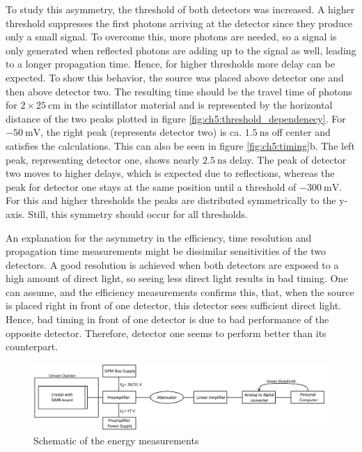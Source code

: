 To study this asymmetry, the threshold of both detectors was increased. A higher threshold suppresses the first photons arriving at the detector since they produce only a small signal. To overcome this, more photons are needed, so a signal is only generated when reflected photons are adding up to the signal as well, leading to a longer propagation time. Hence, for higher thresholds more delay can be expected. To show this behavior, the source was placed above detector one and then above detector two. The resulting time should be the travel time of photons for $2\times\SI{25}{\centi\meter}$ in the scintillator material and is represented by the horizontal distance of the two peaks plotted in figure \ref*{fig:ch5:threshold_dependenecy}. For $\SI{-50}{\milli\volt}$, the right peak (represents detector two) is ca. $\SI{1.5}{\nano\second}$ off center and satisfies the calculations. This can also be seen in figure \ref{fig:ch5:timing}b. The left peak, representing detector one, shows nearly $\SI{2.5}{\nano\second}$ delay. The peak of detector two moves to higher delays, which is expected due to reflections, whereas the peak for detector one stays at the same position until a threshold of $\SI{-300}{\milli\volt}$. For this and higher thresholds the peaks are distributed symmetrically to the y-axis. Still, this symmetry should occur for all thresholds. \par
An explanation for the asymmetry in the efficiency, time resolution and propagation time measurements might be dissimilar sensitivities of the two detectors. A good resolution is achieved when both detectors are exposed to a high amount of direct light, so seeing less direct light results in bad timing. One can assume, and the efficiency measurements confirms this, that, when the source is placed right in front of one detector, this detector sees sufficient direct light. Hence, bad timing in front of one detector is due to bad performance of the opposite detector. Therefore, detector one seems to perform better than its counterpart. \par 
\begin{figure}[t!]
	\centering
	\includegraphics[width=1\linewidth]{./graphics/ch5/scheme_energy.png}
	\caption[Schematic of the energy measurements]{Schematic of the energy measurements}
	\label{fig:ch5:scheme_energy}
\end{figure}
